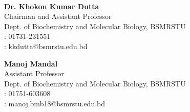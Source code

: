 \documentclass[10pt, a4paper, ragged2e, withhyper]{altacv}
\begin{document}
	\makecvheader
	
	
	\begin{paracol}{2}
		\medskip
		
		
		\smallskip
		
		\smallskip
		
		
		\\
		\smallskip
		
		\textbf{Dr. Khokon Kumar Dutta}\\
		{\footnotesize Chairman and Assistant Professor}\\
		Dept. of Biochemistry and Molecular Biology, BSMRSTU\\
		\faPhone: 01731-231551\\
		\faLaptop: kkdutta@bsmrstu.edu.bd
		\divider
		
		\smallskip
		
		\textbf{Manoj Mandal}\\
		Assistant Professor\\
		Dept. of Biochemistry and Molecular Biology, BSMRSTU\\
		\faPhone: 01751-603608\\
		\faLaptop: {\footnotesize manoj.bmb18@bsmrstu.edu.bd}
		

\end{paracol}
\end{document}
